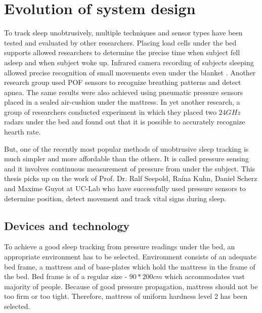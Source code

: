 \chapter{Evolution of system design}
\label{chap:evolution}

To track sleep unobtrusively, multiple techniques and sensor types have been tested and evaluated by other researchers. Placing load cells under the bed supports allowed researchers to determine the precise time when subject fell asleep and when subject woke up\cite{load_cells}. Infrared camera recording of subjects sleeping allowed precise recognition of small movements even under the blanket \cite{video}. Another research group used \ac{POF} sensors to recognize breathing patterns and detect apnea\cite{optical}. The same results were also achieved using pneumatic pressure sensors placed in a sealed air-cushion under the mattress\cite{pneumatic}. In yet another research, a group of researchers conducted experiment in which they placed two $24 GHz$ radars under the bed and found out that it is possible to accurately recognize hearth rate\cite{radar}.

But, one of the recently most popular methods of unobtrusive sleep tracking is much simpler and more affordable than the others. It is called pressure sensing and it involves continuous measurement of pressure from under the subject. This thesis picks up on the work of Prof. Dr. Ralf Seepold, Ra\'ina Kuhn, Daniel Scherz and Maxime Guyot at \ac{UC-Lab}\cite{Kuhn}\cite{Guyot} who have successfully used pressure sensors to determine position, detect movement and track vital signs during sleep.


\section{Devices and technology}

To achieve a good sleep tracking from pressure readings under the bed, an appropriate environment has to be selected. Environment consists of an adequate bed frame, a mattress and of base-plates which hold the mattress in the frame of the bed. Bed frame is of a regular size - $90 * 200cm$ which accommodates vast majority of people. Because of good pressure propagation, mattress should not be too firm or too tight. Therefore, mattress of uniform hardness level 2 has been selected.

